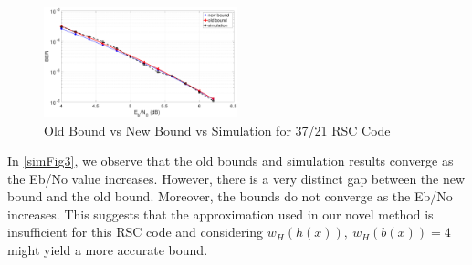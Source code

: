\begin{figure}[h!]
\centering
		\includegraphics[width=0.5\textwidth]{./Images/RSC_37_21_lower_weights.eps}
		\caption{Old Bound vs New Bound vs Simulation for 37/21 RSC Code}
		\label{simFig2}
		\end{figure}
In \ref{simFig3}, we observe that the old bounds and simulation results converge as the Eb/No value increases. However, there is a very distinct gap between the new bound and the old bound. Moreover, the bounds do not converge as the Eb/No increases. This suggests that the approximation used in our novel method is insufficient for this RSC code and considering  $w_H(h(x)),~w_H(b(x))=4$ might yield a more accurate bound.

